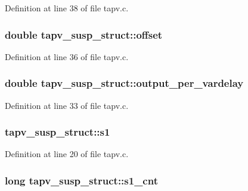 Definition at line 38 of file tapv.\+c.

\subsubsection[{\texorpdfstring{offset}{offset}}]{\setlength{\rightskip}{0pt plus 5cm}double tapv\+\_\+susp\+\_\+struct\+::offset}\hypertarget{structtapv__susp__struct_a8c91cf1875473eb25ea7f51ef29d9e21}{}\label{structtapv__susp__struct_a8c91cf1875473eb25ea7f51ef29d9e21}


Definition at line 36 of file tapv.\+c.

\subsubsection[{\texorpdfstring{output\+\_\+per\+\_\+vardelay}{output_per_vardelay}}]{\setlength{\rightskip}{0pt plus 5cm}double tapv\+\_\+susp\+\_\+struct\+::output\+\_\+per\+\_\+vardelay}\hypertarget{structtapv__susp__struct_afc611973e9b029aabf5bfdd40c0d7792}{}\label{structtapv__susp__struct_afc611973e9b029aabf5bfdd40c0d7792}


Definition at line 33 of file tapv.\+c.

\subsubsection[{\texorpdfstring{s1}{s1}}]{ tapv\+\_\+susp\+\_\+struct\+::s1}\hypertarget{structtapv__susp__struct_a7a82567920fd355ecec0815b4f7cb4d7}{}\label{structtapv__susp__struct_a7a82567920fd355ecec0815b4f7cb4d7}


Definition at line 20 of file tapv.\+c.

\subsubsection[{\texorpdfstring{s1\+\_\+cnt}{s1_cnt}}]{\setlength{\rightskip}{0pt plus 5cm}long tapv\+\_\+susp\+\_\+struct\+::s1\+\_\+cnt}\hypertarget{structtapv__susp__struct_a9797765bc6ade05431d2df11fefad83d}{}\label{structtapv__susp__struct_a9797765bc6ade05431d2df11fefad83d}


